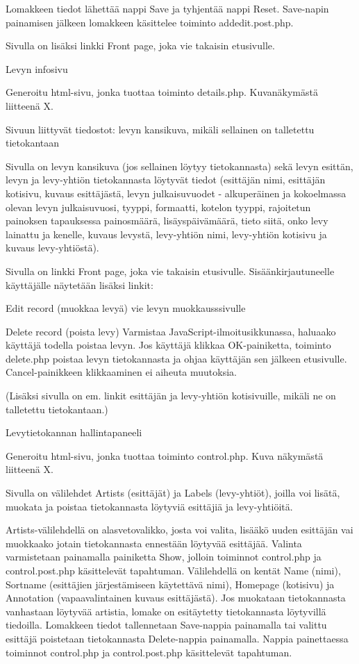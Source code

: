 \documentclass[a4paper,12pt]{report}
\begin{document}
Lomakkeen tiedot lähettää nappi Save ja tyhjentää nappi Reset. Save-napin painamisen jälkeen lomakkeen käsittelee toiminto addedit.post.php.

Sivulla on lisäksi linkki Front page, joka vie takaisin etusivulle.


Levyn infosivu

Generoitu html-sivu, jonka tuottaa toiminto details.php. Kuvanäkymästä liitteenä X.

Sivuun liittyvät tiedostot:
	levyn kansikuva, mikäli sellainen on talletettu tietokantaan

Sivulla on levyn kansikuva (jos sellainen löytyy tietokannasta) sekä levyn esittän, levyn ja levy-yhtiön tietokannasta löytyvät tiedot 
(esittäjän nimi, esittäjän kotisivu, kuvaus esittäjästä, levyn julkaisuvuodet - alkuperäinen ja kokoelmassa olevan levyn julkaisuvuosi, 
tyyppi, formaatti, kotelon tyyppi, rajoitetun painoksen tapauksessa painosmäärä, lisäyspäivämäärä, 
tieto siitä, onko levy lainattu ja kenelle, kuvaus levystä, levy-yhtiön nimi, levy-yhtiön kotisivu ja kuvaus levy-yhtiöstä).

Sivulla on linkki Front page, joka vie takaisin etusivulle. Sisäänkirjautuneelle käyttäjälle näytetään lisäksi linkit:

	Edit record (muokkaa levyä)
		vie levyn muokkausssivulle

	Delete record (poista levy)
		Varmistaa JavaScript-ilmoitusikkunassa, haluaako käyttäjä todella poistaa levyn. 
		Jos käyttäjä klikkaa OK-painiketta, toiminto delete.php poistaa levyn tietokannasta ja ohjaa käyttäjän sen jälkeen etusivulle. 
		Cancel-painikkeen klikkaaminen ei aiheuta muutoksia.

(Lisäksi sivulla on em. linkit esittäjän ja levy-yhtiön kotisivuille, mikäli ne on talletettu tietokantaan.)


Levytietokannan hallintapaneeli

Generoitu html-sivu, jonka tuottaa toiminto control.php. Kuva näkymästä liitteenä X.

Sivulla on välilehdet Artists (esittäjät) ja Labels (levy-yhtiöt), joilla voi lisätä, muokata ja poistaa tietokannasta löytyviä esittäjiä ja levy-yhtiöitä.

Artists-välilehdellä on alasvetovalikko, josta voi valita, lisääkö uuden esittäjän vai muokkaako jotain tietokannasta ennestään löytyvää esittäjää. 
Valinta varmistetaan painamalla painiketta Show, jolloin toiminnot control.php ja control.post.php käsittelevät tapahtuman.
Välilehdellä on kentät Name (nimi), Sortname (esittäjien järjestämiseen käytettävä nimi), 
Homepage (kotisivu) ja Annotation (vapaavalintainen kuvaus esittäjästä). Jos muokataan tietokannasta vanhastaan löytyvää artistia, lomake on esitäytetty tietokannasta löytyvillä tiedoilla. 
Lomakkeen tiedot tallennetaan Save-nappia painamalla tai valittu esittäjä poistetaan tietokannasta Delete-nappia painamalla. 
Nappia painettaessa toiminnot control.php ja control.post.php käsittelevät tapahtuman.
\end{document}
